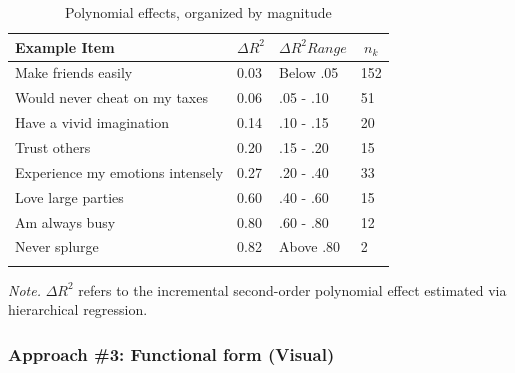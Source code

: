 \documentclass[
  ,jou]{apa6}
\begin{document}
\begin{table}[tbp]

\begin{center}
\begin{threeparttable}

\caption{\label{tab:polytable}Polynomial effects, organized by magnitude}

\begin{tabular}{llll}
\toprule
Example Item & \multicolumn{1}{c}{$\Delta R^2$} & \multicolumn{1}{c}{$\Delta R^2 Range$} & \multicolumn{1}{c}{$n_k$}\\
\midrule
Make friends easily & 0.03 & Below .05 & 152\\
Would never cheat on my taxes & 0.06 & .05 - .10 & 51\\
Have a vivid imagination & 0.14 & .10 - .15 & 20\\
Trust others & 0.20 & .15 - .20 & 15\\
Experience my emotions intensely & 0.27 & .20 - .40 & 33\\
Love large parties & 0.60 & .40 - .60 & 15\\
Am always busy & 0.80 & .60 - .80 & 12\\
Never splurge & 0.82 & Above .80 & 2\\
\bottomrule
\addlinespace
\end{tabular}

\begin{tablenotes}[para]
\normalsize{\textit{Note.} $\Delta R^2$ refers to the incremental second-order polynomial effect estimated via hierarchical regression.}
\end{tablenotes}

\end{threeparttable}
\end{center}

\end{table}

\subsubsection{Approach \#3: Functional form (Visual)}\label{approach-3-functional-form-visual}
\end{document}
